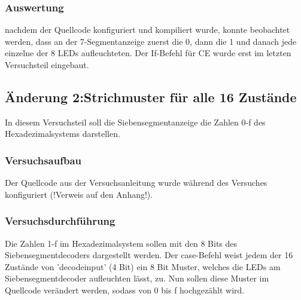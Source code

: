 \documentclass[12pt,a4paper]{article}
\begin{document}
\subsubsection*{Auswertung}
nachdem der Quellcode konfiguriert und kompiliert wurde, konnte beobachtet werden, dass an der 7-Segmentanzeige zuerst die 0, dann die 1 und danach jede einzelne der 8 LEDs aufleuchteten. Der If-Befehl für CE wurde erst im letzten Versuchsteil eingebaut.
\subsection{Änderung 2:Strichmuster für alle 16 Zustände}
In diesem Versuchsteil soll die Siebensegmentanzeige die Zahlen 0-f des Hexadezimalsystems darstellen.
\subsubsection*{Versuchsaufbau}
Der Quellcode aus der Versuchsanleitung wurde während des Versuches konfiguriert (!Verweis auf den Anhang!).
\subsubsection*{Versuchsdurchführung}
Die Zahlen 1-f im Hexadezimalsystem sollen mit den 8 Bits des Siebensegmentdecoders dargestellt werden. Der case-Befehl weist jedem der 16 Zustände von 'decodeinput' (4 Bit) ein 8 Bit Muster, welches die LEDs am Siebensegmentdecoder aufleuchten lässt, zu. Nun sollen diese Muster im Quellcode verändert werden, sodass von 0 bis f hochgezählt wird.
\end{document}
